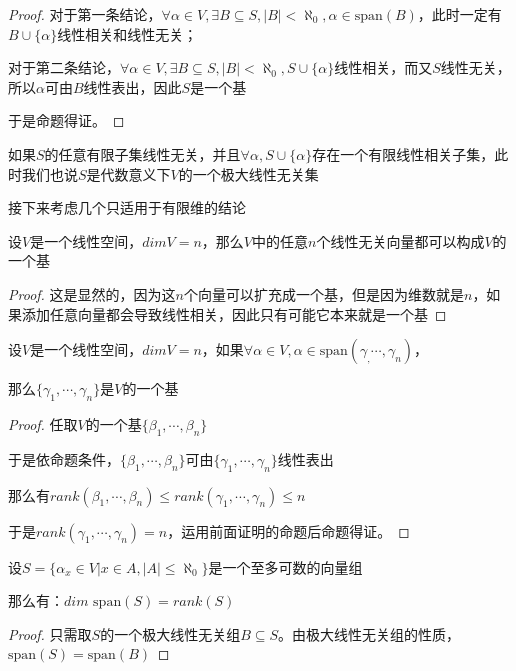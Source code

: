 \documentclass[12pt, a4paper, oneside, UTF8]{ctexbook}
\begin{document}
\begin{para}{0}
\begin{proof}
						对于第一条结论，$\forall \alpha \in V,\exists B \subseteq S,|B| < \aleph_0,\alpha \in \text{span}(B)$，此时一定有$B \cup \{\alpha \}$线性相关和线性无关；

						对于第二条结论，$\forall \alpha \in V,\exists B \subseteq S,|B| < \aleph_0,S \cup \{\alpha \}$线性相关，而又$S$线性无关，所以$\alpha $可由$B$线性表出，因此$S$是一个基

						于是命题得证。
					\end{proof}
					如果$S$的任意有限子集线性无关，并且$\forall \alpha ,S \cup \{\alpha \}$存在一个有限线性相关子集，此时我们也说$S$是代数意义下$V$的一个极大线性无关集
				
					接下来考虑几个只适用于有限维的结论	
				\point{}
					\begin{proposition}
						设$V$是一个线性空间，$dim V=n$，那么$V$中的任意$n$个线性无关向量都可以构成$V$的一个基
					\end{proposition}
					\begin{proof}
						这是显然的，因为这$n$个向量可以扩充成一个基，但是因为维数就是$n$，如果添加任意向量都会导致线性相关，因此只有可能它本来就是一个基
					\end{proof}
				\point{}
					\begin{proposition}
						设$V$是一个线性空间，$dim V=n$，如果$\forall \alpha \in V,\alpha \in \text{span}(\gamma_,\cdots,\gamma_n)$，

						那么$\{\gamma_1,\cdots,\gamma_n\}$是$V$的一个基
					\end{proposition}
					\begin{proof}
						任取$V$的一个基$\{\beta_1,\cdots,\beta_n\}$

						于是依命题条件，$\{\beta_1,\cdots,\beta_n\}$可由$\{\gamma_1,\cdots,\gamma_n\}$线性表出

						那么有$rank(\beta_1,\cdots,\beta_n) \leqslant rank(\gamma_1,\cdots,\gamma_n) \leqslant n$

						于是$rank(\gamma_1,\cdots,\gamma_n)=n$，运用前面证明的命题后命题得证。
					\end{proof}
				\point{}
					\begin{proposition}
						设$S=\{\alpha_x \in V| x \in A,|A| \leqslant \aleph_0\}$是一个至多可数的向量组

						那么有：$dim \text{ span}(S)=rank(S)$
					\end{proposition}
					\begin{proof}
						只需取$S$的一个极大线性无关组$B \subseteq S$。由极大线性无关组的性质，$\text{span}(S)=\text{span}(B)$


\end{proof}
\end{para}
\end{document}
